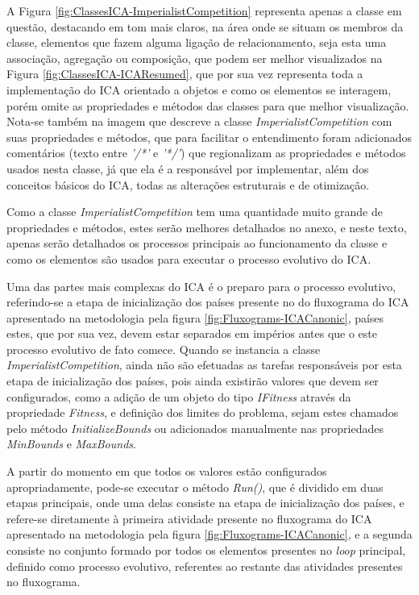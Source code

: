 A Figura \ref{fig:ClassesICA-ImperialistCompetition} representa apenas a classe em questão, destacando em tom mais claros, na área onde se situam os membros da classe, elementos que fazem alguma ligação de relacionamento, seja esta uma associação, agregação ou composição, que podem ser melhor visualizados na Figura \ref{fig:ClassesICA-ICAResumed}, que por sua vez representa toda a implementação do ICA orientado a objetos e como os elementos se interagem, porém omite as propriedades e métodos das classes para que melhor visualização. Nota-se também na imagem que descreve a classe \emph{ImperialistCompetition} com suas propriedades e métodos, que para facilitar o entendimento foram adicionados comentários (texto entre \emph{'/*'} e \emph{'*/'}) que regionalizam as propriedades e métodos usados nesta classe, já que ela é a responsável por implementar, além dos conceitos básicos do ICA, todas as alterações estruturais e de otimização.

Como a classe \emph{ImperialistCompetition} tem uma quantidade muito grande de propriedades e métodos, estes serão melhores detalhados no anexo, e neste texto, apenas serão detalhados os processos principais ao funcionamento da classe e como os elementos são usados para executar o processo evolutivo do ICA.

Uma das partes mais complexas do ICA é o preparo para o processo evolutivo, referindo-se a etapa de inicialização dos países presente no do fluxograma do ICA apresentado na metodologia pela figura \ref{fig:Fluxograms-ICACanonic}, países estes, que por sua vez, devem estar separados em impérios antes que o este processo evolutivo de fato comece. Quando se instancia a classe \emph{ImperialistCompetition}, ainda não são efetuadas as tarefas responsáveis por esta etapa de inicialização dos países, pois ainda existirão valores que devem ser configurados, como a adição de um objeto do tipo \emph{IFitness} através da propriedade \emph{Fitness}, e definição dos limites do problema, sejam estes chamados pelo método \emph{InitializeBounds} ou adicionados manualmente nas propriedades \emph{MinBounds} e \emph{MaxBounds}.

A partir do momento em que todos os valores estão configurados apropriadamente, pode-se executar o método \emph{Run()}, que é dividido em duas etapas principais, onde uma delas consiste na etapa de inicialização dos países, e refere-se diretamente à primeira atividade presente no fluxograma do ICA apresentado na metodologia pela figura \ref{fig:Fluxograms-ICACanonic}, e a segunda consiste no conjunto formado por todos os elementos presentes no \emph{loop} principal, definido como processo evolutivo, referentes ao restante das atividades presentes no fluxograma.


